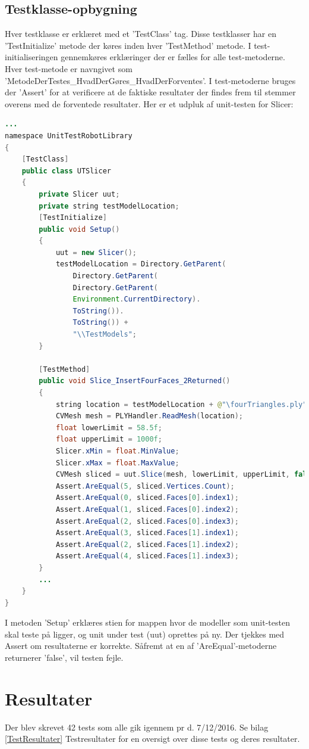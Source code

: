 \subsection{Testklasse-opbygning}
Hver testklasse er erklæret med et 'TestClass' tag. Disse testklasser har en 'TestInitialize' metode der køres inden hver 'TestMethod' metode. I test-initialiseringen gennemkøres erklæringer der er fælles for alle test-metoderne. Hver test-metode er navngivet som 'MetodeDerTestes\_HvadDerGøres\_HvadDerForventes'. I test-metoderne bruges der 'Assert' for at verificere at de faktiske resultater der findes frem til stemmer overens med de forventede resultater. Her er et udpluk af unit-testen for Slicer:
\begin{lstlisting}[language=Java]
...
namespace UnitTestRobotLibrary
{
	[TestClass]
	public class UTSlicer
	{
		private Slicer uut;
		private string testModelLocation;
		[TestInitialize]
		public void Setup()
		{
			uut = new Slicer();
			testModelLocation = Directory.GetParent(
				Directory.GetParent(
				Directory.GetParent(
				Environment.CurrentDirectory).
				ToString()).
				ToString()) +
				"\\TestModels";
		}

		[TestMethod]
		public void Slice_InsertFourFaces_2Returned()
		{
			string location = testModelLocation + @"\fourTriangles.ply";
			CVMesh mesh = PLYHandler.ReadMesh(location);
			float lowerLimit = 58.5f;
			float upperLimit = 1000f;
			Slicer.xMin = float.MinValue;
			Slicer.xMax = float.MaxValue;
			CVMesh sliced = uut.Slice(mesh, lowerLimit, upperLimit, false);
			Assert.AreEqual(5, sliced.Vertices.Count);
			Assert.AreEqual(0, sliced.Faces[0].index1);
			Assert.AreEqual(1, sliced.Faces[0].index2);
			Assert.AreEqual(2, sliced.Faces[0].index3);
			Assert.AreEqual(3, sliced.Faces[1].index1);
			Assert.AreEqual(2, sliced.Faces[1].index2);
			Assert.AreEqual(4, sliced.Faces[1].index3);
		}
		...
	}
}
\end{lstlisting}
I metoden 'Setup' erklæres stien for mappen hvor de modeller som unit-testen skal teste på ligger, og unit under test (uut) oprettes på ny. Der tjekkes med Assert om resultaterne er korrekte. Såfremt at en af 'AreEqual'-metoderne returnerer 'false', vil testen fejle.
\newpage
\section{Resultater}
Der blev skrevet 42 tests som alle gik igennem pr d. 7/12/2016.
Se bilag \ref{TestResultater} Testresultater for en oversigt over disse tests og deres resultater.

